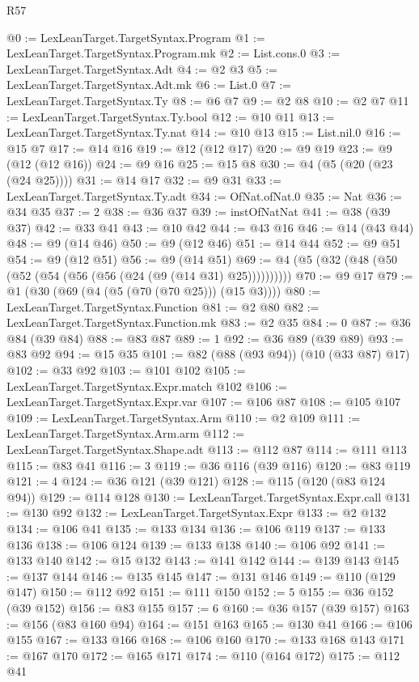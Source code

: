 \begin{lexlean}{R57}
\begin{coremodule}
@0 := LexLeanTarget.TargetSyntax.Program
@1 := LexLeanTarget.TargetSyntax.Program.mk
@2 := List.cons.{0}
@3 := LexLeanTarget.TargetSyntax.Adt
@4 := @2 @3
@5 := LexLeanTarget.TargetSyntax.Adt.mk
@6 := List.{0}
@7 := LexLeanTarget.TargetSyntax.Ty
@8 := @6 @7
@9 := @2 @8
@10 := @2 @7
@11 := LexLeanTarget.TargetSyntax.Ty.bool
@12 := @10 @11
@13 := LexLeanTarget.TargetSyntax.Ty.nat
@14 := @10 @13
@15 := List.nil.{0}
@16 := @15 @7
@17 := @14 @16
@19 := @12 (@12 @17)
@20 := @9 @19
@23 := @9 (@12 (@12 @16))
@24 := @9 @16
@25 := @15 @8
@30 := @4 (@5 (@20 (@23 (@24 @25))))
@31 := @14 @17
@32 := @9 @31
@33 := LexLeanTarget.TargetSyntax.Ty.adt
@34 := OfNat.ofNat.{0}
@35 := Nat
@36 := @34 @35
@37 := 2
@38 := @36 @37
@39 := instOfNatNat
@41 := @38 (@39 @37)
@42 := @33 @41
@43 := @10 @42
@44 := @43 @16
@46 := @14 (@43 @44)
@48 := @9 (@14 @46)
@50 := @9 (@12 @46)
@51 := @14 @44
@52 := @9 @51
@54 := @9 (@12 @51)
@56 := @9 (@14 @51)
@69 := @4 (@5 (@32 (@48 (@50 (@52 (@54 (@56 (@56 (@24 (@9 (@14 @31) @25))))))))))
@70 := @9 @17
@79 := @1 (@30 (@69 (@4 (@5 (@70 (@70 @25))) (@15 @3))))
@80 := LexLeanTarget.TargetSyntax.Function
@81 := @2 @80
@82 := LexLeanTarget.TargetSyntax.Function.mk
@83 := @2 @35
@84 := 0
@87 := @36 @84 (@39 @84)
@88 := @83 @87
@89 := 1
@92 := @36 @89 (@39 @89)
@93 := @83 @92
@94 := @15 @35
@101 := @82 (@88 (@93 @94)) (@10 (@33 @87) @17)
@102 := @33 @92
@103 := @101 @102
@105 := LexLeanTarget.TargetSyntax.Expr.match @102
@106 := LexLeanTarget.TargetSyntax.Expr.var
@107 := @106 @87
@108 := @105 @107
@109 := LexLeanTarget.TargetSyntax.Arm
@110 := @2 @109
@111 := LexLeanTarget.TargetSyntax.Arm.arm
@112 := LexLeanTarget.TargetSyntax.Shape.adt
@113 := @112 @87
@114 := @111 @113
@115 := @83 @41
@116 := 3
@119 := @36 @116 (@39 @116)
@120 := @83 @119
@121 := 4
@124 := @36 @121 (@39 @121)
@128 := @115 (@120 (@83 @124 @94))
@129 := @114 @128
@130 := LexLeanTarget.TargetSyntax.Expr.call
@131 := @130 @92
@132 := LexLeanTarget.TargetSyntax.Expr
@133 := @2 @132
@134 := @106 @41
@135 := @133 @134
@136 := @106 @119
@137 := @133 @136
@138 := @106 @124
@139 := @133 @138
@140 := @106 @92
@141 := @133 @140
@142 := @15 @132
@143 := @141 @142
@144 := @139 @143
@145 := @137 @144
@146 := @135 @145
@147 := @131 @146
@149 := @110 (@129 @147)
@150 := @112 @92
@151 := @111 @150
@152 := 5
@155 := @36 @152 (@39 @152)
@156 := @83 @155
@157 := 6
@160 := @36 @157 (@39 @157)
@163 := @156 (@83 @160 @94)
@164 := @151 @163
@165 := @130 @41
@166 := @106 @155
@167 := @133 @166
@168 := @106 @160
@170 := @133 @168 @143
@171 := @167 @170
@172 := @165 @171
@174 := @110 (@164 @172)
@175 := @112 @41

\end{coremodule}
\end{lexlean}
